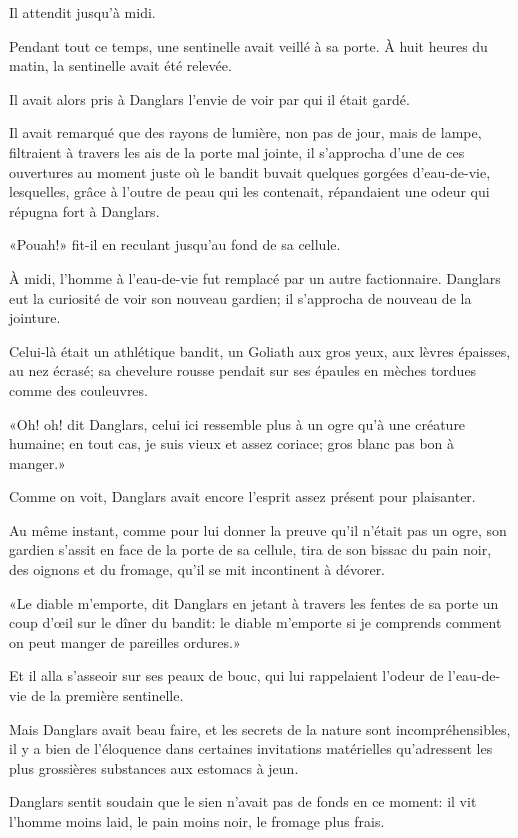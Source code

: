 Il attendit jusqu'à midi. 

Pendant tout ce temps, une sentinelle avait veillé à sa porte. À huit heures du matin, la sentinelle avait été relevée. 

Il avait alors pris à Danglars l'envie de voir par qui il était gardé. 

Il avait remarqué que des rayons de lumière, non pas de jour, mais de lampe, filtraient à travers les ais de la porte mal jointe, il s'approcha d'une de ces ouvertures au moment juste où le bandit buvait quelques gorgées d'eau-de-vie, lesquelles, grâce à l'outre de peau qui les contenait, répandaient une odeur qui répugna fort à Danglars. 

«Pouah!» fit-il en reculant jusqu'au fond de sa cellule. 

À midi, l'homme à l'eau-de-vie fut remplacé par un autre factionnaire. Danglars eut la curiosité de voir son nouveau gardien; il s'approcha de nouveau de la jointure. 

Celui-là était un athlétique bandit, un Goliath aux gros yeux, aux lèvres épaisses, au nez écrasé; sa chevelure rousse pendait sur ses épaules en mèches tordues comme des couleuvres. 

«Oh! oh! dit Danglars, celui ici ressemble plus à un ogre qu'à une créature humaine; en tout cas, je suis vieux et assez coriace; gros blanc pas bon à manger.» 

Comme on voit, Danglars avait encore l'esprit assez présent pour plaisanter. 

Au même instant, comme pour lui donner la preuve qu'il n'était pas un ogre, son gardien s'assit en face de la porte de sa cellule, tira de son bissac du pain noir, des oignons et du fromage, qu'il se mit incontinent à dévorer. 

«Le diable m'emporte, dit Danglars en jetant à travers les fentes de sa porte un coup d'œil sur le dîner du bandit: le diable m'emporte si je comprends comment on peut manger de pareilles ordures.» 

Et il alla s'asseoir sur ses peaux de bouc, qui lui rappelaient l'odeur de l'eau-de-vie de la première sentinelle. 

Mais Danglars avait beau faire, et les secrets de la nature sont incompréhensibles, il y a bien de l'éloquence dans certaines invitations matérielles qu'adressent les plus grossières substances aux estomacs à jeun. 

Danglars sentit soudain que le sien n'avait pas de fonds en ce moment: il vit l'homme moins laid, le pain moins noir, le fromage plus frais. 

